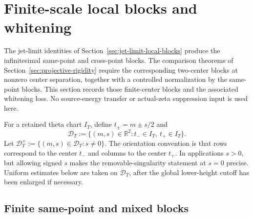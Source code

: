 
\section{Finite-scale local blocks and whitening}
\label{sec:finite-scale-local-blocks-and-whitening}
\quad
{}\quad
{}\quad
{}\quad
{}\quad
{}
\par\medskip

The jet-limit identities of Section~\ref{sec:jet-limit-local-blocks}
produce the infinitesimal same-point and cross-point blocks.  The
comparison theorems of Section~\ref{sec:projective-rigidity} require the
corresponding two-center blocks at nonzero center separation, together
with a controlled normalization by the same-point blocks.  This section
records those finite-center blocks and the associated whitening loss.  No
source-energy transfer or actual-zeta suppression input is used here.

\begin{definition}
\label{def:finite-packet-domain}
For a retained theta chart \(I_T\), define \(t_\pm=m\pm s/2\) and
\[
        \mathcal D_T
        :=\{(m,s)\in\mathbb R^2:
             t_-\in I_T,\ t_+\in I_T\}.
\]
Let \(\mathcal D_T^\times:=\{(m,s)\in\mathcal D_T:s\ne0\}\).  The
orientation convention is that rows correspond to the center \(t_-\) and
columns to the center \(t_+\).  In applications \(s>0\), but allowing
signed \(s\) makes the removable-singularity statement at \(s=0\) precise.
Uniform estimates below are taken on \(\mathcal D_T\), after the global
lower-height cutoff has been enlarged if necessary.
\end{definition}

\subsection{Finite same-point and mixed blocks}
\label{subsec:finite-same-point-and-mixed-blocks}


